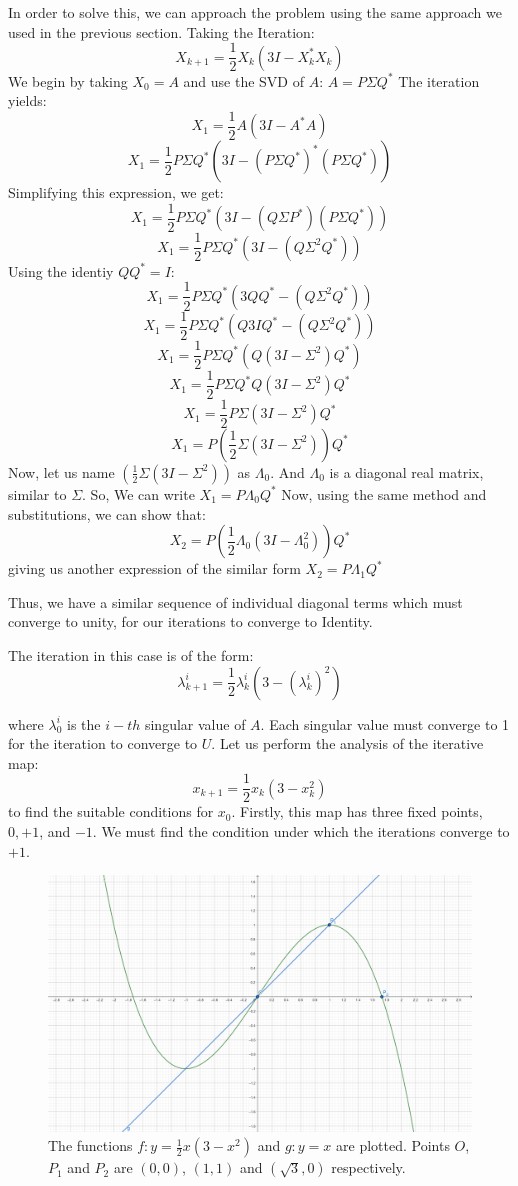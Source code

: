 \documentclass{article}
\begin{document}
In order to solve this, we can approach the problem using the same approach we used in the previous section. 
Taking the Iteration:
\[X_{k+1} = \frac{1}{2}X_k(3I - X_k^{*}X_k)\]
We begin by taking $X_0 = A$ and use the SVD of $A$: $A = P \Sigma Q^*$
The iteration yields:
\[X_{1} = \frac{1}{2}A(3I - A^{*}A)\]
\[X_{1} = \frac{1}{2} P \Sigma Q^*(3I - ( P \Sigma Q^*)^{*}( P \Sigma Q^*))\]
Simplifying this expression, we get:
\[X_{1} = \frac{1}{2} P \Sigma Q^*(3I - ( Q \Sigma P^*)( P \Sigma Q^*))\]
\[X_{1} = \frac{1}{2} P \Sigma Q^*(3I - ( Q \Sigma^2 Q^*))\]
Using the identiy $Q Q^* = I$:
\[X_{1} = \frac{1}{2} P \Sigma Q^*(3Q Q^* - ( Q \Sigma^2 Q^*))\]
\[X_{1} = \frac{1}{2} P \Sigma Q^*(Q 3I Q^* - ( Q \Sigma^2 Q^*))\]
\[X_{1} = \frac{1}{2} P \Sigma Q^*(Q  (3I - \Sigma^2) Q^*)\]
\[X_{1} = \frac{1}{2} P \Sigma Q^*Q  (3I - \Sigma^2) Q^*\]
\[X_{1} = \frac{1}{2} P \Sigma (3I - \Sigma^2) Q^*\]
\[X_{1} = P (\frac{1}{2} \Sigma (3I - \Sigma^2)) Q^*\]
Now, let us name $(\frac{1}{2} \Sigma (3I - \Sigma^2))$ as $\Lambda_0$.
And $\Lambda_0$ is a diagonal real matrix, similar to $\Sigma$.
So, We can write $X_1 = P \Lambda_0 Q^*$
Now, using the same method and substitutions, we can show that:
\[X_{2} = P (\frac{1}{2} \Lambda_0 (3I - \Lambda_0^2)) Q^*\]
giving us another expression of the similar form $X_2 = P \Lambda_1 Q^*$

Thus, we have a similar sequence of individual diagonal terms which must converge to unity, for our iterations to converge to Identity.

The iteration in this case is of the form:
\[\lambda^{i}_{k+1} = \frac{1}{2}\lambda^{i}_k(3 - (\lambda^{i}_k)^2)\]

where $\lambda^{i}_0$ is the $i-th$ singular value of $A$. Each singular value must converge to 1 for the iteration to converge to $U$. Let us perform the analysis of the iterative map:
\[x_{k+1} = \frac{1}{2}x_k(3 - x_{k}^2)\]
to find the suitable conditions for $x_0$. Firstly, this map has three fixed points, $0, +1$, and $-1$. We must find the condition under which the iterations converge to $+1$.
\newpage

\begin{figure}
\centering
\includegraphics[width=1\linewidth]{schulz-iteration.png}
\caption{\label{fig:Schulz Iteration} The functions $f: y = \frac{1}{2}x(3 - x^2)$ and $g:y=x$ are plotted. Points $O$, $P_1$ and $P_2$ are $(0,0)$, $(1, 1)$ and $(\sqrt{3}, 0)$ respectively.}
\end{figure}
\end{document}
